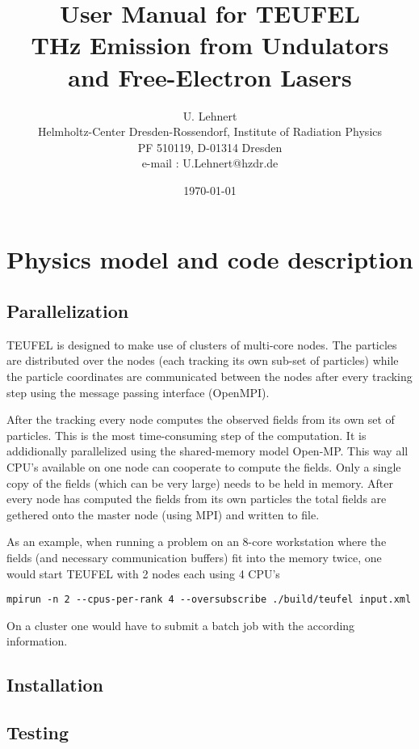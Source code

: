 \documentclass[11pt]{article}
\title{User Manual for TEUFEL \\ THz Emission from Undulators and Free-Electron Lasers}
\author{U. Lehnert\\
\footnotesize{Helmholtz-Center Dresden-Rossendorf, Institute of Radiation Physics}\\
\footnotesize{PF 510119, D-01314 Dresden}\\
\footnotesize{e-mail : U.Lehnert@hzdr.de}}
\date{\today\\[1cm]}
\begin{document}
\maketitle
\tableofcontents

\section{Physics model and code description}

\subsection{Parallelization}

TEUFEL is designed to make use of clusters of multi-core nodes. The particles are distributed over the nodes (each tracking its own sub-set of particles) while the particle coordinates are communicated between the nodes after every tracking step using the message passing interface (OpenMPI).

After the tracking every node computes the observed fields from its own set of particles. This is the most time-consuming step of the computation. It is addidionally parallelized using the shared-memory model Open-MP. This way all CPU's available on one node can cooperate to compute the fields. Only a single copy of the fields (which can be very large) needs to be held in memory. After every node has computed the fields from its own particles the total fields are gethered onto the master node (using MPI) and written to file.

As an example, when running a problem on an 8-core workstation where the fields (and necessary communication buffers) fit into the memory twice, one would start TEUFEL with 2 nodes each using 4 CPU's
\begin{lstlisting}
mpirun -n 2 --cpus-per-rank 4 --oversubscribe ./build/teufel input.xml
\end{lstlisting}

On a cluster one would have to submit a batch job with the according information.

\subsection{Installation}

\subsection{Testing}
\end{document}
